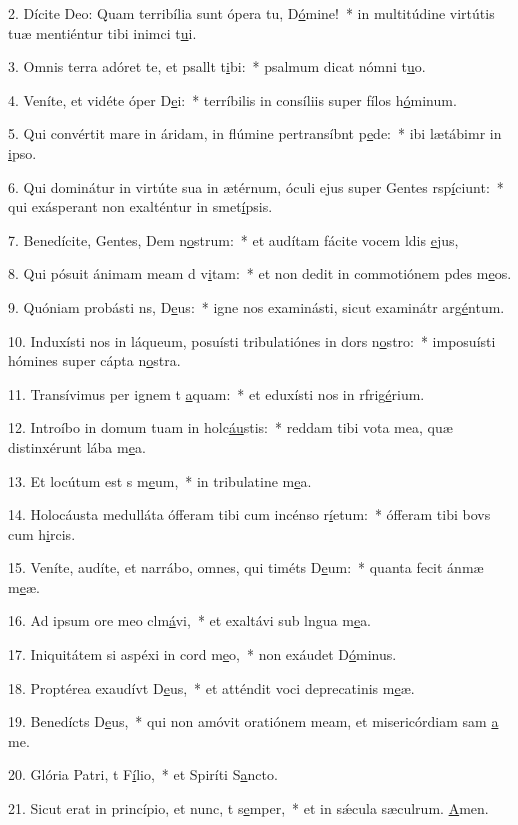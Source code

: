 2. Dícite Deo: Quam terribília sunt ópera tu, D\uline{ó}mine!~* in multitúdine virtútis tuæ mentiéntur tibi inimci t\uline{u}i.\par 
3. Omnis terra adóret te, et psallt t\uline{i}bi:~* psalmum dicat nómni t\uline{u}o.\par 
4. Veníte, et vidéte óper D\uline{e}i:~* terríbilis in consíliis super fílos h\uline{ó}minum.\par 
5. Qui convértit mare in áridam, in flúmine pertransíbnt p\uline{e}de:~* ibi lætábimr in \uline{i}pso.\par 
6. Qui dominátur in virtúte sua in ætérnum, óculi ejus super Gentes rsp\uline{í}ciunt:~* qui exásperant non exalténtur in smet\uline{í}psis.\par 
7. Benedícite, Gentes, Dem n\uline{o}strum:~* et audítam fácite vocem ldis \uline{e}jus,\par 
8. Qui pósuit ánimam meam d v\uline{i}tam:~* et non dedit in commotiónem pdes m\uline{e}os.\par 
9. Quóniam probásti ns, D\uline{e}us:~* igne nos examinásti, sicut examinátr arg\uline{é}ntum.\par 
10. Induxísti nos in láqueum, posuísti tribulatiónes in dors n\uline{o}stro:~* imposuísti hómines super cápta n\uline{o}stra.\par 
11. Transívimus per ignem t \uline{a}quam:~* et eduxísti nos in rfrig\uline{é}rium.\par 
12. Introíbo in domum tuam in holc\uline{áu}stis:~* reddam tibi vota mea, quæ distinxérunt lába m\uline{e}a.\par 
13. Et locútum est s m\uline{e}um,~* in tribulatine m\uline{e}a.\par 
14. Holocáusta medulláta ófferam tibi cum incénso r\uline{í}etum:~* ófferam tibi bovs cum h\uline{i}rcis.\par 
15. Veníte, audíte, et narrábo, omnes, qui timéts D\uline{e}um:~* quanta fecit ánmæ m\uline{e}æ.\par 
16. Ad ipsum ore meo clm\uline{á}vi,~* et exaltávi sub lngua m\uline{e}a.\par 
17. Iniquitátem si aspéxi in cord m\uline{e}o,~* non exáudet D\uline{ó}minus.\par 
18. Proptérea exaudívt D\uline{e}us,~* et atténdit voci deprecatinis m\uline{e}æ.\par 
19. Benedícts D\uline{e}us,~* qui non amóvit oratiónem meam, et misericórdiam sam \uline{a} me.\par 
20. Glória Patri, t F\uline{í}lio,~* et Spiríti S\uline{a}ncto.\par 
21. Sicut erat in princípio, et nunc, t s\uline{e}mper,~* et in sǽcula sæculrum. \uline{A}men.\par 

